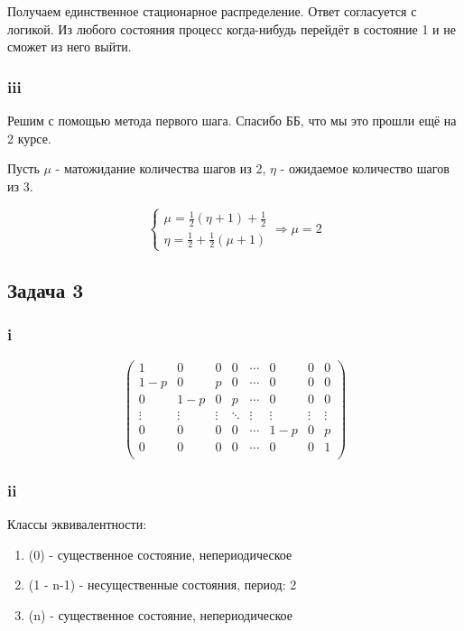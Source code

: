 \documentclass[a4paper,12pt]{article}
\begin{document}
Получаем единственное стационарное распределение. Ответ согласуется с логикой. Из любого состояния процесс когда-нибудь перейдёт в состояние 1 и не сможет из него выйти.

\subsubsection{iii}

Решим с помощью метода первого шага. Спасибо ББ, что мы это прошли ещё на 2 курсе.

Пусть $ \mu  $ - матожидание количества шагов из 2, $ \eta  $ - ожидаемое количество шагов из 3.

\[ \begin{cases}
\mu = \frac{1}{2}(\eta + 1) + \frac{1}{2}\\
\eta = \frac{1}{2} + \frac{1}{2}(\mu + 1)
\end{cases} \Rightarrow 
\mu = 2 \]


\subsection{Задача 3}
\subsubsection{i}

\[ \begin{pmatrix} 
1 & 0 & 0 & 0 &     \cdots & 0 & 0 & 0 \\
1-p & 0 & p & 0 & \cdots & 0 & 0 & 0\\
0 & 1-p & 0 & p & \cdots & 0 & 0 & 0\\
\vdots & \vdots & \vdots & \ddots & \vdots & \vdots & \vdots & \vdots\\
0 & 0 & 0 & 0 & \cdots & 1-p & 0 & p\\
0 & 0 & 0 & 0 & \cdots & 0 & 0 & 1\\
\end{pmatrix} \]

\subsubsection{ii}
Классы эквивалентности:

\begin{enumerate}[\Sun]
	\item (0) - существенное состояние, непериодическое
	\item (1 - n-1) - несущественные состояния, период: 2
	\item (n) - существенное состояние, непериодическое
\end{enumerate}
\end{document}

